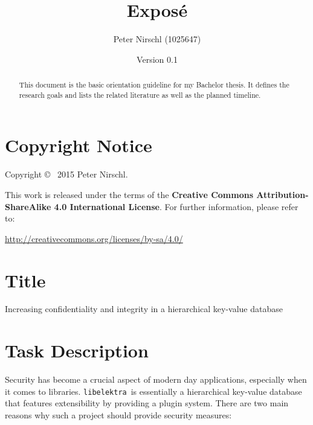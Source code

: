 \documentclass[a4paper,12pt]{article}
\title{Exposé}
\author{Peter Nirschl (1025647)}
\date{Version 0.1}
\newcommand{\libelektra}{\texttt{libelektra}~}
\begin{document}
\maketitle
\begin{abstract}
This document is the basic orientation guideline for my Bachelor thesis.
It defines the research goals and lists the related literature as well as the planned timeline.
\end{abstract}

\vfill

\section*{Copyright Notice}

Copyright \copyright~ 2015 Peter Nirschl.

This work is released under the terms of the \textbf{Creative Commons Attribution-ShareAlike 4.0 International License}.
For further information, please refer to:

\url{http://creativecommons.org/licenses/by-sa/4.0/}

\newpage

\section{Title}

Increasing confidentiality and integrity in a hierarchical key-value database


\section{Task Description}

Security has become a crucial aspect of modern day applications, especially when it comes to libraries.
\libelektra is essentially a hierarchical key-value database that features extensibility by providing a plugin system.
There are two main reasons why such a project should provide security measures:
\end{document}

